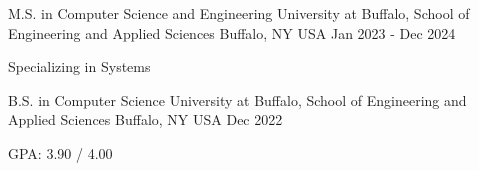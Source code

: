 

\begin{cventries}


  \cventry
    {M.S. in Computer Science and Engineering} %
    {University at Buffalo, School of Engineering and Applied Sciences} %
    {Buffalo, NY USA} %
    {Jan 2023 - Dec 2024} %
    {
      \begin{cvitems} %
        \item {Specializing in Systems}
      \end{cvitems}
    }


  \cventry
    {B.S. in Computer Science} %
    {University at Buffalo, School of Engineering and Applied Sciences} %
    {Buffalo, NY USA} %
    {Dec 2022} %
    {
      \begin{cvitems} %
        \item {GPA: 3.90 / 4.00}
      \end{cvitems}
    }

\end{cventries}
